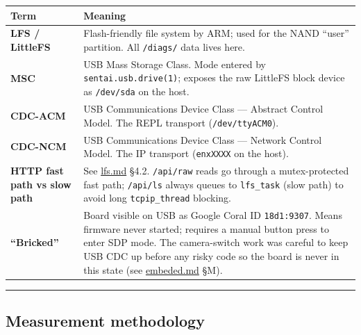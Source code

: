 {\def\LTcaptype{none} %
\begin{longtable}[]{@{}
  >{\raggedright\arraybackslash}p{}
  >{\raggedright\arraybackslash}p{}@{}}
\toprule\noalign{}
\begin{minipage}[b]{\linewidth}\raggedright
Term
\end{minipage} & \begin{minipage}[b]{\linewidth}\raggedright
Meaning
\end{minipage} \\
\midrule\noalign{}
\endhead
\bottomrule\noalign{}
\endlastfoot
\textbf{LFS / LittleFS} & Flash-friendly file system by ARM; used for
the NAND ``user'' partition. All \texttt{/diags/} data lives here. \\
\textbf{MSC} & USB Mass Storage Class. Mode entered by
\texttt{sentai.usb.drive(1)}; exposes the raw LittleFS block device as
\texttt{/dev/sda} on the host. \\
\textbf{CDC-ACM} & USB Communications Device Class --- Abstract Control
Model. The REPL transport (\texttt{/dev/ttyACM0}). \\
\textbf{CDC-NCM} & USB Communications Device Class --- Network Control
Model. The IP transport (\texttt{enxXXXX} on the host). \\
\textbf{HTTP fast path vs slow path} & See \url{lfs.md} §4.2.
\texttt{/api/raw} reads go through a mutex-protected fast path;
\texttt{/api/ls} always queues to \texttt{lfs\_task} (slow path) to
avoid long \texttt{tcpip\_thread} blocking. \\
\textbf{``Bricked''} & Board visible on USB as Google Coral ID
\texttt{18d1:9307}. Means firmware never started; requires a manual
button press to enter SDP mode. The camera-switch work was careful to
keep USB CDC up before any risky code so the board is never in this
state (see \href{../agent/embeded.md}{embeded.md} §M). \\
\end{longtable}
}

\begin{center}\rule{0.5\linewidth}{0.5pt}\end{center}

\subsection{Measurement methodology}\label{measurement-methodology}

